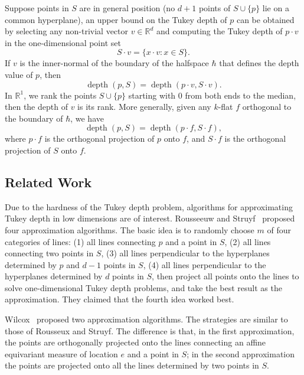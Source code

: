 \documentclass [letterpaper] {article}
\DeclareMathOperator{\depth}{depth}
\begin{document}
Suppose points in $S$ are in general position (no $d + 1$ points of $S \cup \{ p \}$ lie on a common hyperplane), an upper bound on the Tukey depth of $p$ can be obtained by selecting any non-trivial vector $v \in \mathbb{R}^{d}$ and computing the Tukey depth of $p \cdot v$ in the one-dimensional point set
\begin{equation}
  \label{eq:intro.1dset}
  S \cdot v = \{x \cdot v : x \in S \}. \tag{$\ast$}
\end{equation}
If $v$ is the inner-normal of the boundary of the halfspace $\hbar$ that defines the depth value of $p$, then
\begin{equation}
  \label{eq:intro.def1}
  \depth{(p, S)} = \depth{(p \cdot v, S \cdot v)}.
\end{equation}
In $\mathbb{R}^{1}$, we rank the points $S \cup \{ p \}$ starting with $0$ from both ends to the median, then the depth of $v$ is its rank. More generally, given any $k$-flat $f$ orthogonal to the boundary of $\hbar$, we have
\begin{equation}
  \label{eq:intro.defi}
  \depth{(p, S)} = \depth{(p \cdot f, S \cdot f)},
\end{equation}
where $p \cdot f$ is the orthogonal projection of $p$ onto $f$, and $S \cdot f$ is the orthogonal projection of $S$ onto $f$.

\subsection{Related Work}
Due to the hardness of the Tukey depth problem, algorithms for approximating Tukey depth in low dimensions are of interest.
Rousseeuw and Struyf~\cite{Rousseeuw98} proposed four approximation algorithms. The basic idea is to randomly choose $m$ of four categories of lines: (1) all lines connecting $p$ and a point in $S$, (2) all lines connecting two points in $S$, (3) all lines perpendicular to the hyperplanes determined by $p$ and $d-1$ points in $S$, (4) all lines perpendicular to the hyperplanes determined by $d$ points in $S$, then project all points onto the lines to solve one-dimensional Tukey depth problems, and take the best result as the approximation. They claimed that the fourth idea worked best.

Wilcox~\cite{Wilcox03} proposed two approximation algorithms. The strategies are similar to those of Rousseux and Struyf. The difference is that, in the first approximation, the points are orthogonally projected onto the lines connecting an affine equivariant measure of location $e$ and a point in $S$; in the second approximation the points are projected onto all the lines determined by two points in $S$.
\end{document}

